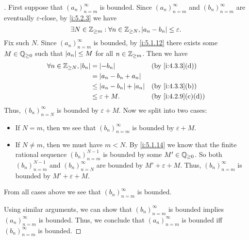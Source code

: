 \begin{proof}[]
  First suppose that \((a_n)_{n = m}^\infty\) is bounded.
  Since \((a_n)_{n = m}^{\infty}\) and \((b_n)_{n = m}^{\infty}\) are eventually \(\varepsilon\)-close, by \cref{i:5.2.3} we have
  \[
    \exists N \in \mathbb{Z}_{\geq m} : \forall n \in \mathbb{Z}_{\geq N}, \left\lvert a_n - b_n\right\rvert \leq \varepsilon.
  \]
  Fix such \(N\).
  Since \((a_n)_{n = m}^\infty\) is bounded, by \cref{i:5.1.12} there exists some \(M \in \mathbb{Q}_{\geq 0}\) such that \(\left\lvert a_n\right\rvert \leq M\) for all \(n \in \mathbb{Z}_{\geq m}\).
  Then we have
  \begin{align*}
    \forall n \in \Z_{\geq N}, \abs{b_n} & = \abs{-b_n}                     &  & \by{i:4.3.3}[d]   \\
                                         & = \abs{a_n - b_n + a_n}                                 \\
                                         & \leq \abs{a_n - b_n} + \abs{a_n} &  & \by{i:4.3.3}[b]   \\
                                         & \leq \varepsilon + M.            &  & \by{i:4.2.9}[c,d]
  \end{align*}
  Thus, \((b_n)_{n = N}^\infty\) is bounded by \(\varepsilon + M\).
  Now we split into two cases:
  \begin{itemize}
    \item If \(N = m\), then we see that \((b_n)_{n = m}^\infty\) is bounded by \(\varepsilon + M\).
    \item If \(N \neq m\), then we must have \(m < N\).
          By \cref{i:5.1.14} we know that the finite rational sequence \((b_n)_{n = m}^{N - 1}\) is bounded by some \(M' \in \mathbb{Q}_{\geq 0}\).
          So both \((b_n)_{n = m}^{N - 1}\) and \((b_n)_{n = N}^\infty\) are bounded by \(M' + \varepsilon + M\).
          Thus, \((b_n)_{n = m}^\infty\) is bounded by \(M' + \varepsilon + M\).
  \end{itemize}
  From all cases above we see that \((b_n)_{n = m}^\infty\) is bounded.

  Using similar arguments, we can show that \((b_n)_{n = m}^\infty\) is bounded implies \((a_n)_{n = m}^\infty\) is bounded.
  Thus, we conclude that \((a_n)_{n = m}^\infty\) is bounded iff \((b_n)_{n = m}^\infty\) is bounded.
\end{proof}
